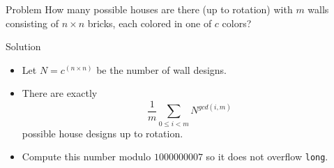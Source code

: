 \begin{slide}
    \begin{block}{Problem}
        How many possible houses are there (up to rotation) with $m$ walls consisting of $n \times n$ bricks, each colored in one of $c$ colors?
    \end{block}
    \begin{block}{Solution}
    \begin{itemize}
        \item Let $N = c^{(n \times n)}$ be the number of wall designs.
        \item There are exactly \[ \frac{1}{m} \sum\limits_{0 \leq i < m} N^{\mathit{gcd}(i,m)} \] possible house designs up to rotation.
        \item Compute this number modulo $1000000007$ so it does not overflow \texttt{long}.
    \end{itemize}
    \end{block}
\end{slide}
